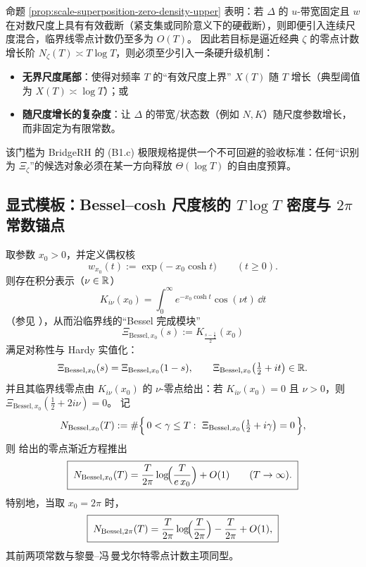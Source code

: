 \begin{remark}\label{rem:scale-superposition-density-threshold}
命题 \ref{prop:scale-superposition-zero-density-upper} 表明：若 $\Delta$ 的 $u$-带宽固定且 $w$ 在对数尺度上具有有效截断（紧支集或同阶意义下的硬截断），则即便引入连续尺度混合，临界线零点计数仍至多为 $O(T)$。
因此若目标是逼近经典 $\zeta$ 的零点计数增长阶 $N_\zeta(T)\asymp T\log T$，则必须至少引入一条硬升级机制：
\begin{itemize}
  \item \textbf{无界尺度尾部}：使得对频率 $T$ 的“有效尺度上界” $X(T)$ 随 $T$ 增长（典型阈值为 $X(T)\asymp \log T$）；或
  \item \textbf{随尺度增长的复杂度}：让 $\Delta$ 的带宽/状态数（例如 $N,K$）随尺度参数增长，而非固定为有限常数。
\end{itemize}
该门槛为 BridgeRH 的 (B1.c) 极限规格提供一个不可回避的验收标准：任何“识别为 $\Xi_\zeta$”的候选对象必须在某一方向释放 $\Theta(\log T)$ 的自由度预算。
\end{remark}

\subsection{显式模板：Bessel--cosh 尺度核的 \texorpdfstring{$T\log T$}{TlogT} 密度与 \texorpdfstring{$2\pi$}{2pi} 常数锚点}\label{subsec:bessel-template}

\begin{proposition}\label{prop:bessel-cosh-kernel-density}
取参数 $x_0>0$，并定义偶权核
$$
w_{x_0}(t):=\exp\!\bigl(-x_0\cosh t\bigr)\qquad(t\ge 0).
$$
则存在积分表示（$\nu\in\mathbb{R}$）
$$
K_{i\nu}(x_0)=\int_{0}^{\infty}e^{-x_0\cosh t}\cos(\nu t)\,\dd t
$$
（参见 \cite{Paris2022KiNuZeros}），从而沿临界线的“Bessel 完成模块”
$$
\Xi_{\mathrm{Bessel},x_0}(s):=K_{\frac{s-\frac12}{2}}(x_0)
$$
满足对称性与 Hardy 实值化：
$$
\Xi_{\mathrm{Bessel},x_0}(s)=\Xi_{\mathrm{Bessel},x_0}(1-s),
\qquad
\Xi_{\mathrm{Bessel},x_0}\!\left(\tfrac12+it\right)\in\mathbb{R}.
$$
并且其临界线零点由 $K_{i\nu}(x_0)$ 的 $\nu$-零点给出：若 $K_{i\nu}(x_0)=0$ 且 $\nu>0$，则
$
\Xi_{\mathrm{Bessel},x_0}(\tfrac12+2i\nu)=0
$。
记
$$
N_{\mathrm{Bessel},x_0}(T):=\#\Bigl\{\,0<\gamma\le T:\ \Xi_{\mathrm{Bessel},x_0}\!\left(\tfrac12+i\gamma\right)=0\,\Bigr\},
$$
则 \cite{Paris2022KiNuZeros} 给出的零点渐近方程推出
$$
\boxed{\;
N_{\mathrm{Bessel},x_0}(T)
=\frac{T}{2\pi}\log\!\Bigl(\frac{T}{e\,x_0}\Bigr)+O(1)\qquad(T\to\infty).\;}
$$
特别地，当取 $x_0=2\pi$ 时，
$$
\boxed{\;
N_{\mathrm{Bessel},2\pi}(T)
=\frac{T}{2\pi}\log\!\Bigl(\frac{T}{2\pi}\Bigr)-\frac{T}{2\pi}+O(1),\;}
$$
其前两项常数与黎曼--冯\,曼戈尔特零点计数主项同型。
\end{proposition}


